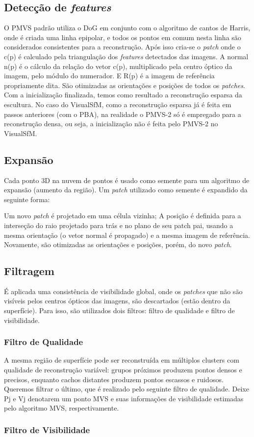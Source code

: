 \begin{itemize}
\subsection{Detecção de {\it features}}
O PMVS padrão utiliza o DoG em conjunto com o algoritmo de cantos de Harris, onde é criada uma linha epipolar, e todos os pontos em comum nesta linha são considerados consistentes para a reconstrução. 
Após isso cria-se o {\it patch} onde o c(p) é calculado pela triangulação dos {\it features} detectados das imagens. A normal n(p) é o cálculo da relação do vetor c(p), multiplicado pela centro óptico da imagem, pelo módulo do numerador. E R(p) é a imagem de referência propriamente dita. São otimizadas as orientações e posições de todos os {\it patches}.
Com a inicialização finalizada, temos como resultado a reconstrução esparsa da escultura. No caso do VisualSfM, como a reconstrução esparsa já é feita em passos anteriores (com o PBA), na realidade o PMVS-2 só é empregado para a reconstrução densa, ou seja, a inicialização não é feita pelo PMVS-2 no VisualSfM.

\subsection{Expansão}
Cada ponto 3D na nuvem de pontos é usado como semente para um algoritmo de expansão (aumento da região). Um {\it patch} utilizado como semente é expandido da seguinte forma:

Um novo {\it patch} é projetado em uma célula vizinha;
A posição é definida para a interseção do raio projetado para trás e no plano de seu patch pai, usando a mesma orientação (o vetor normal é propagado) e a mesma imagem de referência.
Novamente, são otimizadas as orientações e posições, porém, do novo {\it patch}.	

\subsection{Filtragem}
É aplicada uma consistência de visibilidade global, onde os {\it patches} que não são visíveis pelos centros ópticos das imagens, são descartados (estão dentro da superfície). Para isso, são utilizados dois filtros: filtro de qualidade e filtro de visibilidade.

\subsubsection{Filtro de Qualidade}

A mesma região de superfície pode ser reconstruída em múltiplos clusters com qualidade de reconstrução variável: grupos próximos produzem pontos densos e precisos, enquanto cachos distantes produzem pontos escassos e ruidosos. Queremos filtrar o último, que é realizado pelo seguinte filtro de qualidade. Deixe Pj e Vj denotarem um ponto MVS e suas informações de visibilidade estimadas pelo algoritmo MVS, respectivamente.

\subsubsection{Filtro de Visibilidade}

\end{itemize}
